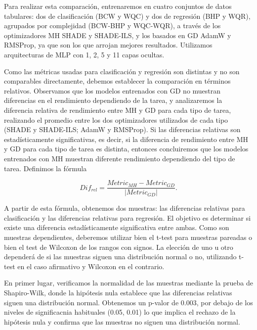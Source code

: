 Para realizar esta comparación, entrenaremos en cuatro conjuntos de datos tabulares: dos de clasificación (BCW y WQC) y dos de regresión (BHP y WQR), agrupados por complejidad (BCW-BHP y WQC-WQR), a través de los optimizadores MH SHADE y SHADE-ILS, y los basados en GD AdamW y RMSProp, ya que son los que arrojan mejores resultados. Utilizamos arquitecturas de MLP con 1, 2, 5 y 11 capas ocultas. 

Como las métricas usadas para clasificación y regresión son distintas y no son comparables directamente, debemos establecer la comparación en términos relativos. Observamos que los modelos entrenados con GD no muestran diferencias en el rendimiento dependiendo de la tarea, y analizaremos la diferencia relativa de rendimiento entre MH y GD para cada tipo de tarea, realizando el promedio entre los dos optimizadores utilizados de cada tipo (SHADE y SHADE-ILS; AdamW y RMSProp). Si las diferencias relativas son estadísticamente significativas, es decir, si la diferencia de rendimiento entre MH y GD para cada tipo de tarea es distinta, entonces concluiremos que los modelos entrenados con MH muestran diferente rendimiento dependiendo del tipo de tarea. Definimos la fórmula


$$Dif_{rel} = \frac{Metric_{MH}-Metric_{GD}}{|Metric_{GD}|}.$$


A partir de esta fórmula, obtenemos dos muestras: las diferencias relativas para clasificación y las diferencias relativas para regresión. El objetivo es determinar si existe una diferencia estadísticamente significativa entre ambas. Como son muestras dependientes, deberemos utilizar bien el t-test para muestras pareadas o bien el test de Wilcoxon de los rangos con signos. La elección de uno u otro dependerá de si las muestras siguen una distribución normal o no, utilizando t-test en el caso afirmativo y Wilcoxon en el contrario.

En primer lugar, verificamos la normalidad de las muestras mediante la prueba de Shapiro-Wilk, donde la hipótesis nula establece que las diferencias relativas siguen una distribución normal. Obtenemos un p-valor de 0.003, por debajo de los niveles de significacnia habituales (0.05, 0.01) lo que implica el rechazo de la hipótesis nula y confirma que las muestras no siguen una distribución normal.

